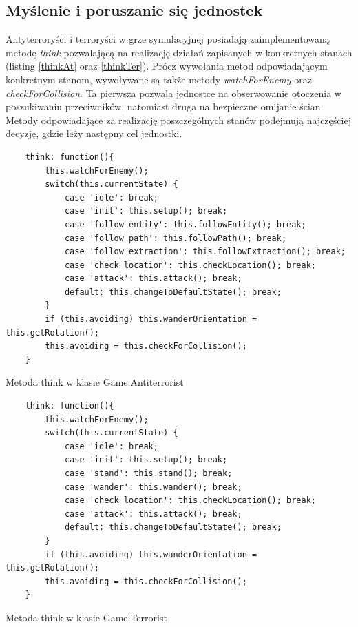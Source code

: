 \subsection{Myślenie i poruszanie się jednostek}
Antyterroryści i terroryści w grze symulacyjnej posiadają zaimplementowaną metodę \emph{think} pozwalającą na realizację działań zapisanych w konkretnych stanach (listing \ref{thinkAt} oraz \ref{thinkTer}). Prócz wywołania metod odpowiadającym konkretnym stanom, wywoływane są także metody \emph{watchForEnemy} oraz \emph{checkForCollision}. Ta pierwsza pozwala jednostce na obserwowanie otoczenia w poszukiwaniu przeciwników, natomiast druga na bezpieczne omijanie ścian. Metody odpowiadające za realizację poszczególnych stanów podejmują najczęściej decyzję, gdzie leży następny cel jednostki.

\begin{table}
\begin{center}
\begin{lstlisting}
    think: function(){
        this.watchForEnemy();
        switch(this.currentState) {
            case 'idle': break;
            case 'init': this.setup(); break;
            case 'follow entity': this.followEntity(); break;
            case 'follow path': this.followPath(); break;
            case 'follow extraction': this.followExtraction(); break;
            case 'check location': this.checkLocation(); break;
            case 'attack': this.attack(); break;
            default: this.changeToDefaultState(); break;
        }
        if (this.avoiding) this.wanderOrientation = this.getRotation();
        this.avoiding = this.checkForCollision();
    }
 \end{lstlisting}
\caption {Metoda think w klasie Game.Antiterrorist}
\label{thinkAt}
\end{center}
\end{table}

\begin{table}
\begin{center}
\begin{lstlisting}
    think: function(){
        this.watchForEnemy();
        switch(this.currentState) {
            case 'idle': break;
            case 'init': this.setup(); break;
            case 'stand': this.stand(); break;
            case 'wander': this.wander(); break;
            case 'check location': this.checkLocation(); break;
            case 'attack': this.attack(); break;
            default: this.changeToDefaultState(); break;
        }
        if (this.avoiding) this.wanderOrientation = this.getRotation();
        this.avoiding = this.checkForCollision();
    }
 \end{lstlisting}
\caption {Metoda think w klasie Game.Terrorist}
\label{thinkTer}
\end{center}
\end{table}

